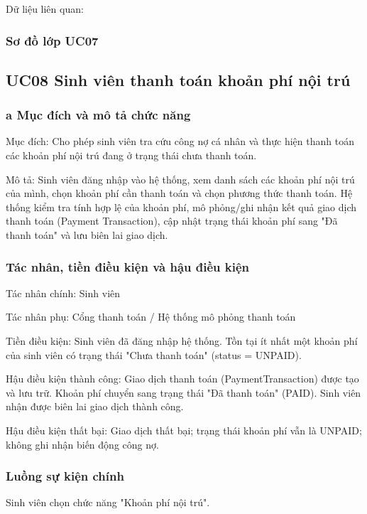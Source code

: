 Dữ liệu liên quan:

\subsubsection{Sơ đồ lớp UC07}


\subsection{UC08 Sinh viên thanh toán khoản phí nội trú}

\subsubsection{a Mục đích và mô tả chức năng}

Mục đích: Cho phép sinh viên tra cứu công nợ cá nhân và thực hiện thanh toán các khoản phí nội trú đang ở trạng thái chưa thanh toán.

Mô tả: Sinh viên đăng nhập vào hệ thống, xem danh sách các khoản phí nội trú của mình, chọn khoản phí cần thanh toán và chọn phương thức thanh toán. Hệ thống kiểm tra tính hợp lệ của khoản phí, mô phỏng/ghi nhận kết quả giao dịch thanh toán (Payment Transaction), cập nhật trạng thái khoản phí sang "Đã thanh toán" và lưu biên lai giao dịch.

\subsubsection{Tác nhân, tiền điều kiện và hậu điều kiện}

Tác nhân chính: Sinh viên

Tác nhân phụ: Cổng thanh toán / Hệ thống mô phỏng thanh toán

Tiền điều kiện: Sinh viên đã đăng nhập hệ thống. Tồn tại ít nhất một khoản phí của sinh viên có trạng thái "Chưa thanh toán" (status = UNPAID).

Hậu điều kiện thành công: Giao dịch thanh toán (PaymentTransaction) được tạo và lưu trữ. Khoản phí chuyển sang trạng thái "Đã thanh toán" (PAID). Sinh viên nhận được biên lai giao dịch thành công.

Hậu điều kiện thất bại: Giao dịch thất bại; trạng thái khoản phí vẫn là UNPAID; không ghi nhận biến động công nợ.

\subsubsection{Luồng sự kiện chính}

Sinh viên chọn chức năng "Khoản phí nội trú".

